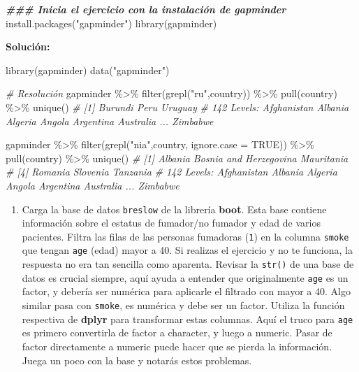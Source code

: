 \documentclass[
]{article}
\newenvironment{Shaded}{\begin{snugshade}}{\end{snugshade}}
\newcommand{\AttributeTok}[1]{\textcolor[rgb]{0.77,0.63,0.00}{#1}}
\newcommand{\CommentTok}[1]{\textcolor[rgb]{0.56,0.35,0.01}{\textit{#1}}}
\newcommand{\ConstantTok}[1]{\textcolor[rgb]{0.00,0.00,0.00}{#1}}
\newcommand{\DocumentationTok}[1]{\textcolor[rgb]{0.56,0.35,0.01}{\textbf{\textit{#1}}}}
\newcommand{\FunctionTok}[1]{\textcolor[rgb]{0.00,0.00,0.00}{#1}}
\newcommand{\NormalTok}[1]{#1}
\newcommand{\SpecialCharTok}[1]{\textcolor[rgb]{0.00,0.00,0.00}{#1}}
\newcommand{\StringTok}[1]{\textcolor[rgb]{0.31,0.60,0.02}{#1}}
\providecommand{\tightlist}{%
  \setlength{\itemsep}{0pt}\setlength{\parskip}{0pt}}
\theoremstyle{definition}
\theoremstyle{definition}
\theoremstyle{definition}
\theoremstyle{definition}
\theoremstyle{remark}
\begin{document}
\begin{Shaded}
\begin{Highlighting}[]
\DocumentationTok{\#\#\# Inicia el ejercicio con la instalación de gapminder}
\FunctionTok{install.packages}\NormalTok{(}\StringTok{"gapminder"}\NormalTok{)}
\FunctionTok{library}\NormalTok{(gapminder)}
\end{Highlighting}
\end{Shaded}

\textbf{Solución:}

\begin{Shaded}
\begin{Highlighting}[]
\FunctionTok{library}\NormalTok{(gapminder)}
\FunctionTok{data}\NormalTok{(}\StringTok{"gapminder"}\NormalTok{)}

\CommentTok{\# Resolución}
\NormalTok{gapminder }\SpecialCharTok{\%\textgreater{}\%} 
  \FunctionTok{filter}\NormalTok{(}\FunctionTok{grepl}\NormalTok{(}\StringTok{"ru"}\NormalTok{,country)) }\SpecialCharTok{\%\textgreater{}\%} 
  \FunctionTok{pull}\NormalTok{(country) }\SpecialCharTok{\%\textgreater{}\%} 
  \FunctionTok{unique}\NormalTok{()}
\CommentTok{\# [1] Burundi Peru    Uruguay}
\CommentTok{\# 142 Levels: Afghanistan Albania Algeria Angola Argentina Australia ... Zimbabwe}

\NormalTok{gapminder }\SpecialCharTok{\%\textgreater{}\%} 
  \FunctionTok{filter}\NormalTok{(}\FunctionTok{grepl}\NormalTok{(}\StringTok{"nia"}\NormalTok{,country, }\AttributeTok{ignore.case =} \ConstantTok{TRUE}\NormalTok{)) }\SpecialCharTok{\%\textgreater{}\%} 
  \FunctionTok{pull}\NormalTok{(country) }\SpecialCharTok{\%\textgreater{}\%} 
  \FunctionTok{unique}\NormalTok{()}
\CommentTok{\# [1] Albania                Bosnia and Herzegovina Mauritania            }
\CommentTok{\# [4] Romania                Slovenia               Tanzania              }
\CommentTok{\# 142 Levels: Afghanistan Albania Algeria Angola Argentina Australia ... Zimbabwe}
\end{Highlighting}
\end{Shaded}

\begin{enumerate}
\def\labelenumi{\arabic{enumi}.}
\tightlist
\item
  Carga la base de datos \texttt{breslow} de la librería \textbf{boot}. Esta base contiene información sobre el estatus de fumador/no fumador y edad de varios pacientes. Filtra las filas de las personas fumadoras (\texttt{1}) en la columna \texttt{smoke} que tengan \texttt{age} (edad) mayor a 40. Si realizas el ejercicio y no te funciona, la respuesta no era tan sencilla como aparenta. Revisar la \texttt{str()} de una base de datos es crucial siempre, aquí ayuda a entender que originalmente \texttt{age} es un factor, y debería ser numérica para aplicarle el filtrado con mayor a 40. Algo similar pasa con \texttt{smoke}, es numérica y debe ser un factor. Utiliza la función respectiva de \textbf{dplyr} para transformar estas columnas. Aquí el truco para \texttt{age} es primero convertirla de factor a character, y luego a numeric. Pasar de factor directamente a numeric puede hacer que se pierda la información. Juega un poco con la base y notarás estos problemas.
\end{enumerate}
\end{document}
